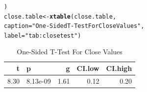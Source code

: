 \documentclass{article}\usepackage[]{graphicx}\usepackage[]{xcolor}
\makeatletter
\newcommand{\hlsng}[1]{\textcolor[rgb]{0.192,0.494,0.8}{#1}}%
\newcommand{\hldef}[1]{\textcolor[rgb]{0.345,0.345,0.345}{#1}}%
\newcommand{\hlkwb}[1]{\textcolor[rgb]{0.69,0.353,0.396}{#1}}%
\newcommand{\hlkwc}[1]{\textcolor[rgb]{0.333,0.667,0.333}{#1}}%
\newcommand{\hlkwd}[1]{\textcolor[rgb]{0.737,0.353,0.396}{\textbf{#1}}}%
\newenvironment{kframe}{%
 \def\at@end@of@kframe{}%
 \ifinner\ifhmode%
  \def\at@end@of@kframe{\end{minipage}}%
  \begin{minipage}{\columnwidth}%
 \fi\fi%
 \def\FrameCommand##1{\hskip\@totalleftmargin \hskip-\fboxsep
 \colorbox{shadecolor}{##1}\hskip-\fboxsep
     \hskip-\linewidth \hskip-\@totalleftmargin \hskip\columnwidth}%
 \MakeFramed {\advance\hsize-\width
   \@totalleftmargin\z@ \linewidth\hsize
   \@setminipage}}%
 {\par\unskip\endMakeFramed%
 \at@end@of@kframe}
\newenvironment{knitrout}{}{} %
\makeatother
\begin{document}
\begin{enumerate}
\begin{enumerate}
\begin{knitrout}
\begin{kframe}
\begin{alltt}
\hldef{)}
\hldef{close.table} \hlkwb{<-} \hlkwd{xtable}\hldef{(close.table,}
                      \hlkwc{caption} \hldef{=} \hlsng{"One-Sided T-Test For Close Values"}\hldef{,}
                         \hlkwc{label} \hldef{=} \hlsng{"tab:closetest"}\hldef{)}
\end{alltt}
\end{kframe}
\end{knitrout}
\begin{table}[H]
\centering
\begingroup\small
\begin{tabular}{rlrrr}
  \hline
t & p & g & CI.low & CI.high \\ 
  \hline
8.30 & 8.13e-09 & 1.61 & 0.12 & 0.20 \\ 
   \hline
\end{tabular}
\endgroup
\caption{One-Sided T-Test For Close Values} 
\label{tab:closetest}
\end{table}


\end{enumerate}
\end{enumerate}
\end{document}
